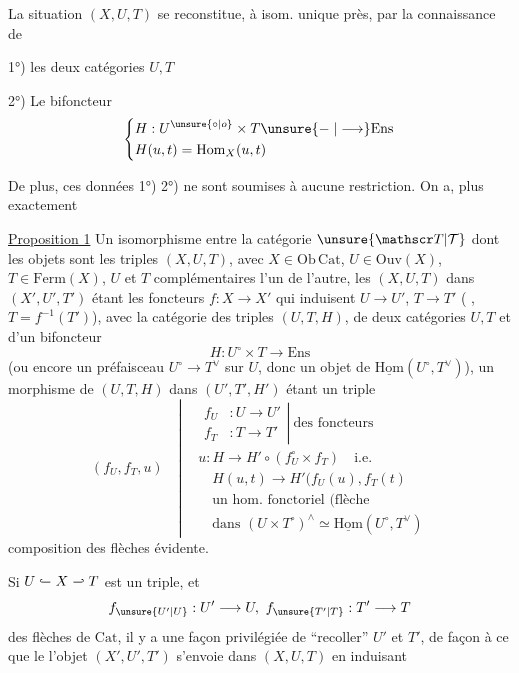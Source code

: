 La situation $(X,U,T)$ se reconstitue, à isom. unique près, par la connaissance de

1°) les deux catégories $U,T$

2°) Le bifoncteur
\[
\left\{\begin{aligned} &H:U^{\unsure{\circ|o}}\times T\unsure{\relbar|\longrightarrow}\mathrm{Ens}\\ &H(u,t)=\mathrm{Hom}_X(u,t)\end{aligned}\right.
\]

De plus, ces données 1°) 2°) ne sont soumises à aucune restriction. On a, plus exactement

\uline{Proposition 1} Un isomorphisme entre la catégorie $\unsure{\mathscr T|\mathcal T}$ dont les objets sont les triples $(X,U,T)$, avec $X\in\mathrm{Ob}\,\mathrm{Cat}$, $U\in\mathrm{Ouv}(X)$, $T\in\mathrm{Ferm}(X)$, $U$ et $T$ complémentaires l'un de l'autre, les  
$(X,U,T)$ dans $(X',U',T')$ étant les foncteurs $f:X\longrightarrow X'$ qui induisent $U\longrightarrow U'$, $T\longrightarrow T'$ ( , $T=f^{-1}(T')$), avec la catégorie  des triples $(U,T,H)$, de deux catégories $U,T$ et d'un bifoncteur
\[
H:U^\circ\times T\longrightarrow\mathrm{Ens}
\]
(ou encore un préfaisceau $U^\circ\longrightarrow T^\vee$ sur $U$, donc un objet de $\underline{\mathrm{Hom}}(U^\circ,T^\vee)$), un morphisme de $(U,T,H)$ dans $(U',T',H')$ étant un triple
\[
(f_U,f_T,u)\quad\left|\begin{aligned}&\left.\begin{aligned}f_U &: U\longrightarrow U'\\ f_T &: T\longrightarrow T'\end{aligned}\right|\ \text{des foncteurs}\\ &u:H\longrightarrow H'\circ(f_U^\circ\times f_T)\quad\text{i.e.}\\ &\quad H(u,t)\longrightarrow H'(f_U(u),f_T(t)\\ &\quad\text{un hom. fonctoriel (flèche}\\ &\quad\text{dans }(U\times T^\circ)^\wedge\simeq\underline{\mathrm{Hom}}(U^\circ,T^\vee)\end{aligned}\right.
\]
composition des flèches évidente.

Si $U\mathrel{\lhook\joinrel\relbar}X\mathrel{\relbar\joinrel\rhook}T$ est un triple,  et
\[
f_{\unsure{U'|U}}:U'\longrightarrow U,\ f_{\unsure{T'|T}}:T'\longrightarrow T
\]
des flèches de $\mathrm{Cat}$, il y a une façon privilégiée de ``recoller'' $U'$ et $T'$, de façon à ce que le l'objet $(X',U',T')$ s'envoie dans $(X,U,T)$  en induisant
